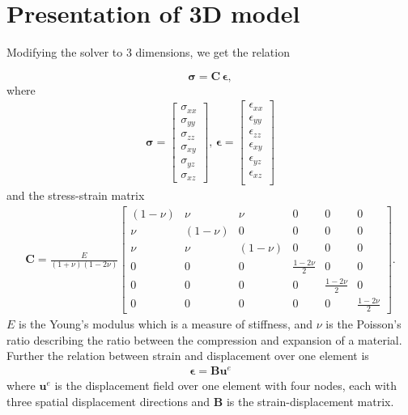 \section{Presentation of 3D model}
Modifying the solver to 3 dimensions, we get the relation 

\begin{equation}
\label{stress-strain}
\bm{\sigma} = \bm{C} \, \bm{\epsilon},
\end{equation}
where
\begin{align*}
\bm{\sigma} =
\begin{bmatrix}
\sigma_{xx} \\
\sigma_{yy} \\
\sigma_{zz} \\
\sigma_{xy} \\
\sigma_{yz} \\
\sigma_{xz}
\end{bmatrix}, \,
\bm{\epsilon} = 
\begin{bmatrix}
\epsilon_{xx} \\
\epsilon_{yy} \\
\epsilon_{zz} \\
\epsilon_{xy} \\
\epsilon_{yz} \\
\epsilon_{xz} \\
\end{bmatrix}
\end{align*}
and the stress-strain matrix
\begin{align*}
\bm{C} = \frac{E}{(1+\nu)(1-2\nu)}
\begin{bmatrix}
(1-\nu) & \nu & \nu & 0 & 0 & 0 \\
\nu & (1-\nu) & 0 & 0 & 0 & 0 \\
\nu & \nu & (1-\nu) & 0 & 0 & 0 \\
0 & 0 & 0 & \frac{1-2\nu}{2} & 0 & 0 \\
0 & 0 & 0 & 0 & \frac{1-2\nu}{2} & 0 \\
0 & 0 & 0 & 0 & 0 & \frac{1-2\nu}{2}
\end{bmatrix}.
\end{align*}
$E$ is the Young's modulus which is a measure of stiffness, and $\nu$ is the Poisson's ratio describing the ratio between the compression and expansion of a material. Further the relation between strain and displacement over one element is
\begin{align}
\label{strain-displacement}
\bm{\epsilon} = \bm{B} \bm{u}^e
\end{align}
where $\bm{u}^e$ is the displacement field over one element with four nodes, each with three spatial displacement directions and $\bm{B}$ is the strain-displacement matrix.
